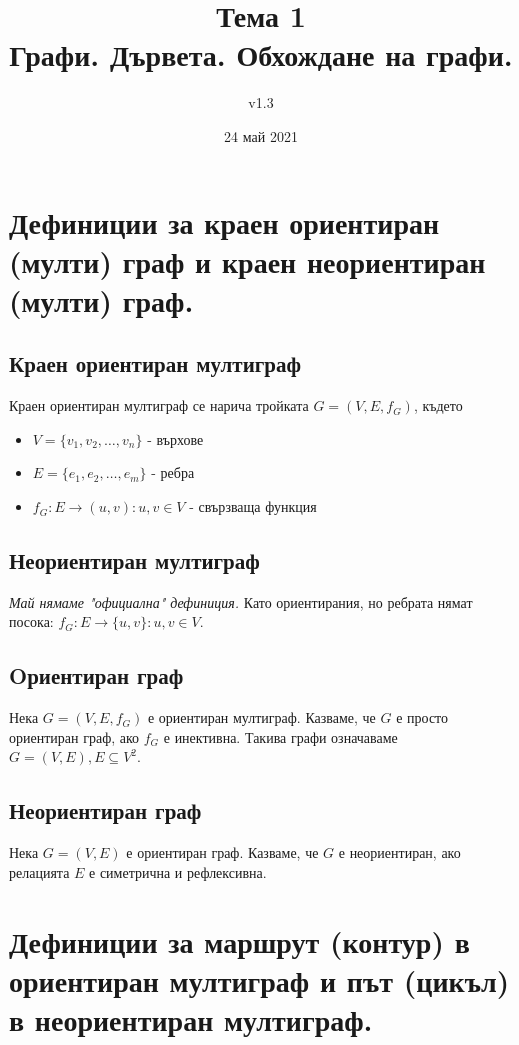 \documentclass[fleqn,12pt]{article}
\title{Тема 1\\ Графи. Дървета. Обхождане на графи.}
\author{v1.3}
\date{24 май 2021}
\begin{document}
\maketitle

\tableofcontents

\begin{flushleft}

\section{Дефиниции за краен ориентиран (мулти) граф и краен неориентиран (мулти) граф.}
\subsection{Краен ориентиран мултиграф}
Краен ориентиран мултиграф се нарича тройката $G = (V, E, f_G)$, където
\begin{itemize}
	\item $V = \{ v_1, v_2, \dots, v_n \}$ - върхове
	\item $E = \{ e_1, e_2, \dots, e_m \}$ - ребра
	\item $f_G : E \rightarrow (u,v) : u,v \in V$ - свързваща функция
\end{itemize}

\subsection{Неориентиран мултиграф}
\textit{Май нямаме "официална" дефиниция. } Като ориентирания, но ребрата нямат посока: $f_G : E \rightarrow \{u,v\} : u,v \in V$.

\subsection{Oриентиран граф}
Нека $G = (V, E, f_G)$ е ориентиран мултиграф. Казваме, че $G$ е просто ориентиран граф, ако $f_G$ е инективна. 
Такива графи означаваме $G = (V, E), E \subseteq V^2$.

\subsection{Неориентиран граф}
Нека $G = (V, E)$ е ориентиран граф. Казваме, че $G$ е неориентиран, ако релацията $E$ е симетрична и рефлексивна.

\section{Дефиниции за маршрут (контур) в ориентиран мултиграф и път (цикъл) в неориентиран мултиграф.}

\end{flushleft}
\end{document}
